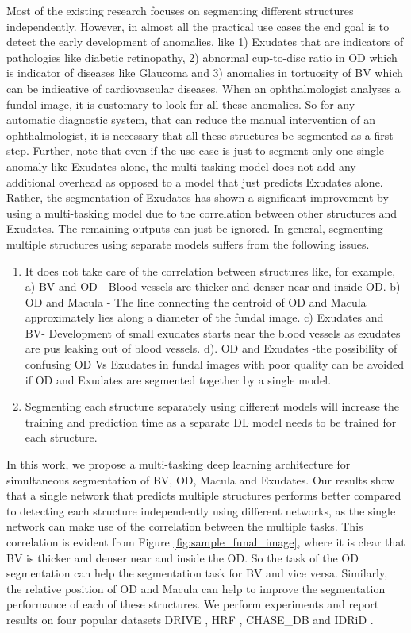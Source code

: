 \documentclass[utf8]{FrontiersinHarvard} %
\begin{document}
Most of the existing research focuses on segmenting different structures independently. However, in almost all the practical use cases the end goal is to detect the early  development of anomalies, like 1) Exudates that are indicators of pathologies like diabetic retinopathy, 2) abnormal cup-to-disc ratio in OD which is indicator of diseases like  Glaucoma and   3) anomalies in tortuosity of  BV which  can be indicative of cardiovascular diseases. When an ophthalmologist analyses a fundal image, it is customary to look for all these anomalies.  So for any automatic diagnostic system,  that can reduce the manual intervention of an  ophthalmologist, it is necessary that all these structures be segmented as a first step. Further, note that even if the use case is just to segment only one single anomaly like Exudates alone, the multi-tasking model does not add any additional overhead as opposed to a model that just predicts Exudates alone. Rather, the segmentation of Exudates has shown a significant improvement by using a multi-tasking model due to the correlation between other structures and Exudates. The remaining outputs can just be ignored. In general, segmenting multiple structures using separate models suffers from  the following issues. 
\begin{enumerate}
\item It does not take care of the correlation between structures like, for example, a) BV and OD - Blood vessels are thicker and denser near and inside OD.  b) OD and Macula - The line connecting the centroid of OD and Macula approximately lies along a diameter of the fundal image. c) Exudates and BV- Development of small exudates starts near the blood vessels as exudates are pus leaking out of blood vessels. d). OD and Exudates -the possibility of confusing OD Vs Exudates in fundal images with poor quality can be avoided if OD and Exudates are segmented together by a single model.
\item Segmenting each structure separately using different models will increase the training and prediction time as a separate DL model needs to be trained for each structure.
\end{enumerate}


In this work, we propose a multi-tasking deep learning architecture for simultaneous segmentation of BV, OD, Macula and Exudates. Our results show that a single network that predicts multiple structures  performs better compared to detecting  each structure independently using different networks, as the single network can make use of the correlation between the multiple tasks. This correlation is evident from Figure \ref{fig:sample_funal_image}, where it is clear that BV is thicker and denser near and inside the OD. So the task of the OD segmentation can help the segmentation task for BV and vice versa.  Similarly, the relative position of OD and Macula can help to improve the segmentation performance of each of these structures. We perform experiments and report results on four popular datasets DRIVE , HRF \cite{budai2013robust}, CHASE\_DB and IDRiD \cite{h25w98-18}.
\end{document}
